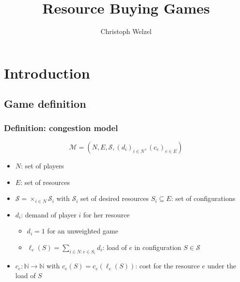 \documentclass{beamer}
\title{Resource Buying Games}
\author[C. Welzel]{Christoph Welzel}
\newcommand{\tupel}[1]{\left(#1\right)}
\begin{document}

\maketitle
\section{Introduction}
\begin{frame}
\end{frame}

\subsection{Game definition}
\begin{frame}
  \frametitle{Definition: congestion model}
  \begin{equation*}
    \mathcal{M} = \tupel{N, E, \mathcal{S}, \left(d_{i}\right)_{i\in N},
    \left(c_{e}\right)_{e\in E}}
  \end{equation*}
  \vspace{-1cm}
  \begin{itemize}
    \item $N$: set of players
    \item $E$: set of resources
    \item $\mathcal{S} = \times_{i\in N}\mathcal{S}_{i}$ with $\mathcal{S}_{i}$
      set of desired resources $S_{i}\subseteq E$: set of configurations
    \item $d_{i}$: demand of player $i$ for her resource
      \begin{itemize}
        \item $d_{i} = 1$ for an unweighted game
        \item $\ell_{e}(S) = \sum_{i\in N:e\in S_{i}}d_{i}$: load of $e$
          in configuration $S\in\mathcal{S}$
      \end{itemize}
    \item $c_{e}:\mathbb{N}\rightarrow\mathbb{N}$ with
      $c_{e}(S) = c_{e}(\ell_{e}(S))$: cost for the resource $e$ under the load
      of $S$
  \end{itemize}
\end{frame}
\end{document}
